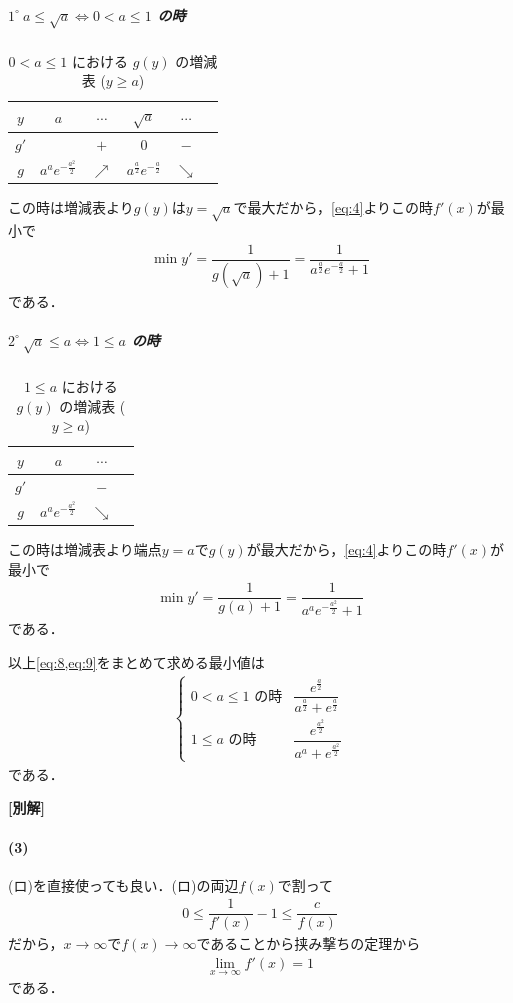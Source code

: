 \documentclass[../../main.tex]{subfiles}
\begin{document}
\subparagraph{$1^\circ \ a \le \sqrt{a} \Leftrightarrow 0 < a \le 1$ の時}

\begin{table}[htb]
  \centering
  \caption{$0 < a \le 1$ における $g(y)$ の増減表 ($y \ge a$)}
  \label{tab:variation_case1}
  \begin{tabular}{c|ccccc}
    $y$ & $a$ & $\cdots$ & $\sqrt{a}$ & $\cdots$ \\
    \hline
    $g'$ & & $+$ & $0$ & $-$ \\
    \hline
    $g$ & $a^a e^{-\frac{a^2}{2}}$ & $\nearrow$ & $a^{\frac{a}{2}} e^{-\frac{a}{2}}$ & $\searrow$
  \end{tabular}
\end{table}

この時は増減表より$g(y)$は$y=\sqrt{a}$で最大だから，\cref{eq:4}よりこの時$f'(x)$が最小で
\begin{align}
  \min y' = \dfrac{1}{g(\sqrt{a}) + 1} = \dfrac{1}{a^{\frac{a}{2}} e^{-\frac{a}{2}} + 1} \label{eq:8}
\end{align}
である．

\subparagraph{$2^\circ \ \sqrt{a} \le a \Leftrightarrow 1 \le a$ の時}

\begin{table}[htb]
  \centering
  \caption{$1 \le a$ における $g(y)$ の増減表 ($y \ge a$)}
  \label{tab:variation_case2}
  \begin{tabular}{c|ccc}
    $y$ & $a$ & $\cdots$ \\
    \hline
    $g'$ & & $-$ \\
    \hline
    $g$ & $a^a e^{-\frac{a^2}{2}}$ & $\searrow$
  \end{tabular}
\end{table}

この時は増減表より端点$y=a$で$g(y)$が最大だから，\cref{eq:4}よりこの時$f'(x)$が最小で
\begin{align}
  \min y' = \dfrac{1}{g(a) + 1} = \dfrac{1}{a^a e^{-\frac{a^2}{2}} + 1} \label{eq:9}
\end{align}
である．
\casesend

以上\cref{eq:8,eq:9}をまとめて求める最小値は
\begin{align}
  \begin{cases}
    0 < a \le 1 \text{ の時} & \dfrac{e^{\frac{a}{2}}}{a^{\frac{a}{2}} + e^{\frac{a}{2}}} \\
    1 \le a \text{ の時} & \dfrac{e^{\frac{a^2}{2}}}{a^a + e^{\frac{a^2}{2}}}
  \end{cases}
\end{align}
である．

{\bf [別解]}

\paragraph{(3)}

(ロ)を直接使っても良い．(ロ)の両辺$f(x)$で割って
\begin{align}
  0 \le \dfrac{1}{f'(x)} - 1 \le \dfrac{c}{f(x)}
\end{align}
だから，$x\to\infty$で$f(x)\to\infty$であることから挟み撃ちの定理から
\begin{align}
  \lim_{x\to\infty} f'(x) = 1
\end{align}
である．
\end{document}
